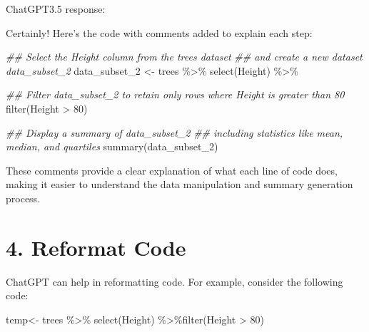 \documentclass[
  letterpaper,
  DIV=11,
  numbers=noendperiod]{scrreprt}
\newenvironment{Shaded}{\begin{snugshade}}{\end{snugshade}}
\newcommand{\DecValTok}[1]{\textcolor[rgb]{0.68,0.00,0.00}{#1}}
\newcommand{\DocumentationTok}[1]{\textcolor[rgb]{0.37,0.37,0.37}{\textit{#1}}}
\newcommand{\FunctionTok}[1]{\textcolor[rgb]{0.28,0.35,0.67}{#1}}
\newcommand{\NormalTok}[1]{\textcolor[rgb]{0.00,0.23,0.31}{#1}}
\newcommand{\OtherTok}[1]{\textcolor[rgb]{0.00,0.23,0.31}{#1}}
\newcommand{\SpecialCharTok}[1]{\textcolor[rgb]{0.37,0.37,0.37}{#1}}
\begin{document}
ChatGPT3.5 response:

\leavevmode{}%
Certainly! Here's the code with comments added to explain each step:

\begin{Shaded}
\begin{Highlighting}[]
\DocumentationTok{\#\# Select the \textquotesingle{}Height\textquotesingle{} column from the \textquotesingle{}trees\textquotesingle{} dataset }
\DocumentationTok{\#\# and create a new dataset \textquotesingle{}data\_subset\_2\textquotesingle{}}
\NormalTok{data\_subset\_2 }\OtherTok{\textless{}{-}} 
\NormalTok{  trees }\SpecialCharTok{\%\textgreater{}\%}
  \FunctionTok{select}\NormalTok{(Height) }\SpecialCharTok{\%\textgreater{}\%}
  
\DocumentationTok{\#\# Filter \textquotesingle{}data\_subset\_2\textquotesingle{} to retain only rows where \textquotesingle{}Height\textquotesingle{} is greater than 80}
  \FunctionTok{filter}\NormalTok{(Height }\SpecialCharTok{\textgreater{}} \DecValTok{80}\NormalTok{)}

\DocumentationTok{\#\# Display a summary of \textquotesingle{}data\_subset\_2\textquotesingle{}}
\DocumentationTok{\#\# including statistics like mean, median, and quartiles}
\FunctionTok{summary}\NormalTok{(data\_subset\_2)}
\end{Highlighting}
\end{Shaded}

These comments provide a clear explanation of what each line of code
does, making it easier to understand the data manipulation and summary
generation process.

\hypertarget{reformat-code}{%
\section{4. Reformat Code}\label{reformat-code}}

ChatGPT can help in reformatting code. For example, consider the
following code:

\begin{Shaded}
\begin{Highlighting}[]
\NormalTok{temp}\OtherTok{\textless{}{-}}\NormalTok{    trees }\SpecialCharTok{\%\textgreater{}\%} \FunctionTok{select}\NormalTok{(Height) }\SpecialCharTok{\%\textgreater{}\%}\FunctionTok{filter}\NormalTok{(Height }\SpecialCharTok{\textgreater{}} \DecValTok{80}\NormalTok{)}
\end{Highlighting}
\end{Shaded}
\end{document}
